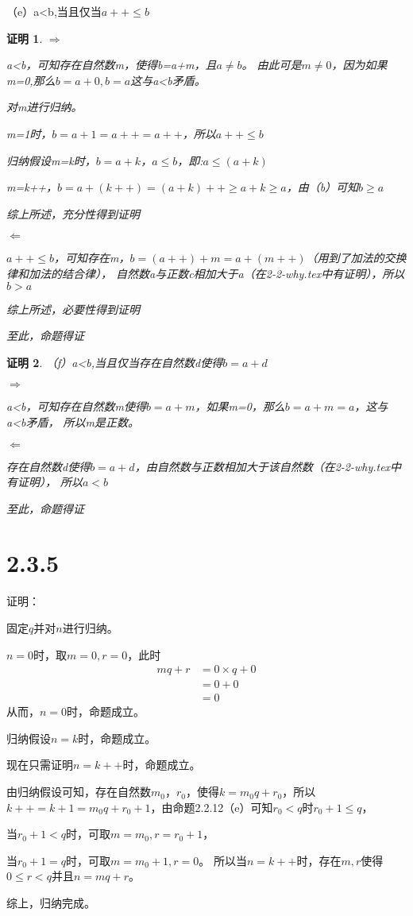\documentclass{article}
\theoremstyle{mystyle}
\theoremstyle{zproofstyle}
\newtheorem*{zproof}{证明}
\begin{document}
（e）a<b,当且仅当$a++ \leq b$
\begin{zproof}
  $\Rightarrow$

  a<b，可知存在自然数m，使得b=a+m，且$a \neq b$。
  由此可是$m \neq 0$，因为如果m=0,那么$b=a+0, b=a$这与a<b矛盾。

  对m进行归纳。

  m=1时，$b=a+1=a++=a++$，所以$a++ \leq b$

  归纳假设m=k时，$b=a+k$，$a \leq b$，即:$a \leq (a+k)$

  m=k++，$b=a+(k++)=(a+k)++ \geq a+k \geq a$，由（b）可知$b \geq a$

  综上所述，充分性得到证明

  $\Leftarrow$

  $a++ \leq b$，可知存在m，$b=(a++)+m=a+(m++)$（用到了加法的交换律和加法的结合律），
  自然数a与正数c相加大于a（在2-2-why.tex中有证明），所以$b > a$

  综上所述，必要性得到证明

  至此，命题得证
\end{zproof}

\begin{zproof}

  （f）a<b,当且仅当存在自然数d使得$b=a+d$

  $\Rightarrow$

  a<b，可知存在自然数m使得$b=a+m$，如果m=0，那么$b=a+m=a$，这与a<b矛盾，
  所以m是正数。

  $\Leftarrow$

  存在自然数d使得$b=a+d$，由自然数与正数相加大于该自然数（在2-2-why.tex中有证明），
  所以$a<b$

  至此，命题得证

\end{zproof}

\section*{2.3.5}

证明：

固定$q$并对$n$进行归纳。

$n=0$时，取$m=0, r=0$，此时
\begin{align*}
  mq + r & = 0 \times q + 0 \\
         & = 0 + 0          \\
         & = 0
\end{align*}
从而，$n=0$时，命题成立。

归纳假设$n=k$时，命题成立。

现在只需证明$n=k++$时，命题成立。

由归纳假设可知，存在自然数$m_0$，$r_0$，使得$k=m_0 q + r_0$，所以
$k++ = k+1 = m_0 q + r_0 + 1$，由命题2.2.12（e）可知$r_0 < q$时$r_0 + 1 \leq q$，

当$r_0 + 1 < q$时，可取$m=m_0, r = r_0 + 1$，

当$r_0 + 1 = q$时，可取$m=m_0 + 1, r = 0$。
所以当$n=k++$时，存在$m,r$使得$0 \leq r < q$并且$n = mq + r$。

综上，归纳完成。
\end{document}
